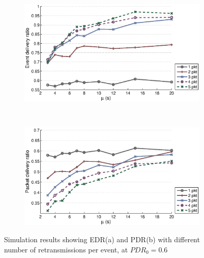 \begin{figure}[p]
    \centering
    \begin{subfigure}[t]{0.9\textwidth}
        \centering
        \includegraphics[width=\textwidth] {../../sw/pc/matlab/simulation-result/retrans-count-edr-20min-pdr0.6.eps}
        \caption{}
    \end{subfigure} 
    \\
    \begin{subfigure}[t]{0.9\textwidth}
        \centering
        \includegraphics[width=\textwidth] {../../sw/pc/matlab/simulation-result/retrans-count-pdr-20min-pdr0.6.eps}
        \caption{}
    \end{subfigure}
    \caption[EDR and PDR with different transmission redundancy, $PDR_0 = 0.6$]{Simulation results showing EDR(a) and PDR(b) with different number of retransmissions per event, at $PDR_0 = 0.6$}\label{fig:retrans-lambda-0.6}
\end{figure}


